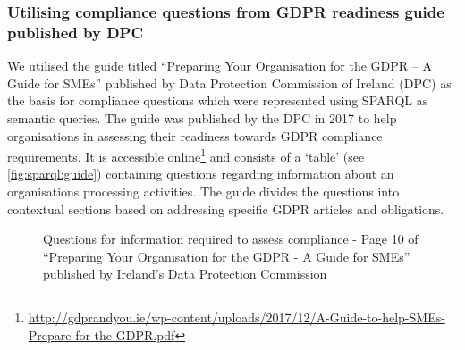 \subsubsection{Utilising compliance questions from GDPR readiness guide published by DPC}
We utilised the guide titled ``Preparing Your Organisation for the GDPR – A Guide for SMEs'' published by Data Protection Commission of Ireland (DPC) as the basis for compliance questions which were represented using SPARQL as semantic queries.
The guide was published by the DPC in 2017 to help organisations in assessing their readiness towards GDPR compliance requirements.
It is accessible online\footnote{\url{http://gdprandyou.ie/wp-content/uploads/2017/12/A-Guide-to-help-SMEs-Prepare-for-the-GDPR.pdf}} and consists of a `table' (see  \autoref{fig:sparql:guide}) containing questions regarding information about an organisations processing activities.
The guide divides the questions into contextual sections based on addressing specific GDPR articles and obligations.
\begin{figure}[htbp]
\centering
{}
\caption{Questions for information required to assess compliance - Page 10 of ``Preparing Your Organisation for the GDPR - A Guide for SMEs'' published by Ireland's Data Protection Commission}
\label{fig:sparql:guide}
\end{figure}

